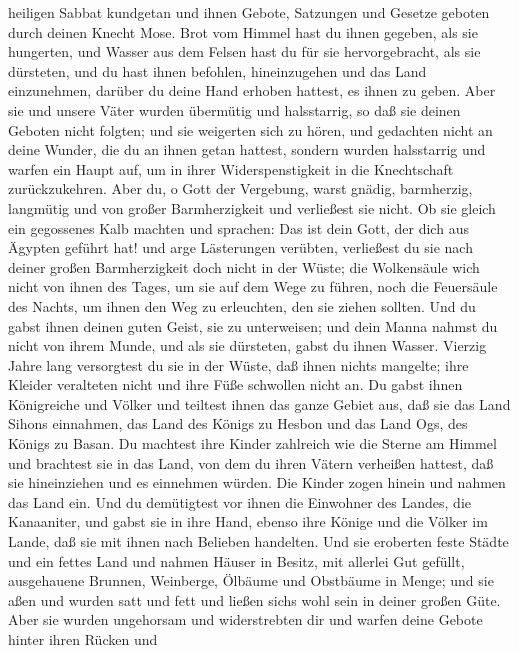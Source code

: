 heiligen Sabbat kundgetan und ihnen Gebote, Satzungen und Gesetze
geboten durch deinen Knecht Mose.  Brot vom Himmel hast
du ihnen gegeben, als sie hungerten, und Wasser aus dem Felsen hast du
für sie hervorgebracht, als sie dürsteten, und du hast ihnen befohlen,
hineinzugehen und das Land einzunehmen, darüber du deine Hand erhoben
hattest, es ihnen zu geben.  Aber sie und unsere Väter
wurden übermütig und halsstarrig, so daß sie deinen Geboten nicht
folgten;  und sie weigerten sich zu hören, und gedachten
nicht an deine Wunder, die du an ihnen getan hattest, sondern wurden
halsstarrig und warfen ein Haupt auf, um in ihrer Widerspenstigkeit in
die Knechtschaft zurückzukehren. Aber du, o Gott der Vergebung, warst
gnädig, barmherzig, langmütig und von großer Barmherzigkeit und
verließest sie nicht.  Ob sie gleich ein gegossenes Kalb
machten und sprachen: Das ist dein Gott, der dich aus Ägypten geführt
hat! und arge Lästerungen verübten,  verließest du sie
nach deiner großen Barmherzigkeit doch nicht in der Wüste; die
Wolkensäule wich nicht von ihnen des Tages, um sie auf dem Wege zu
führen, noch die Feuersäule des Nachts, um ihnen den Weg zu erleuchten,
den sie ziehen sollten.  Und du gabst ihnen deinen guten
Geist, sie zu unterweisen; und dein Manna nahmst du nicht von ihrem
Munde, und als sie dürsteten, gabst du ihnen Wasser. 
Vierzig Jahre lang versorgtest du sie in der Wüste, daß ihnen nichts
mangelte; ihre Kleider veralteten nicht und ihre Füße schwollen nicht
an.  Du gabst ihnen Königreiche und Völker und teiltest
ihnen das ganze Gebiet aus, daß sie das Land Sihons einnahmen, das Land
des Königs zu Hesbon und das Land Ogs, des Königs zu Basan.
 Du machtest ihre Kinder zahlreich wie die Sterne am
Himmel und brachtest sie in das Land, von dem du ihren Vätern verheißen
hattest, daß sie hineinziehen und es einnehmen würden. 
Die Kinder zogen hinein und nahmen das Land ein. Und du demütigtest vor
ihnen die Einwohner des Landes, die Kanaaniter, und gabst sie in ihre
Hand, ebenso ihre Könige und die Völker im Lande, daß sie mit ihnen nach
Belieben handelten.  Und sie eroberten feste Städte und
ein fettes Land und nahmen Häuser in Besitz, mit allerlei Gut gefüllt,
ausgehauene Brunnen, Weinberge, Ölbäume und Obstbäume in Menge; und sie
aßen und wurden satt und fett und ließen sich\textquotesingle s wohl
sein in deiner großen Güte.  Aber sie wurden ungehorsam
und widerstrebten dir und warfen deine Gebote hinter ihren Rücken und
